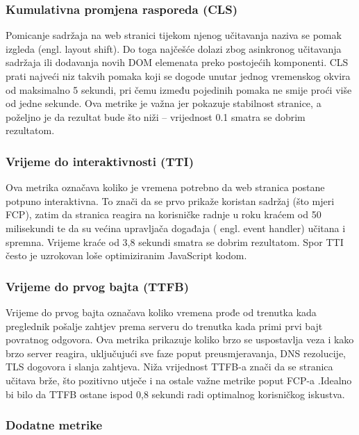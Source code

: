 \subsubsection{Kumulativna promjena rasporeda (CLS)}

Pomicanje sadržaja na web stranici tijekom njenog učitavanja naziva se  pomak izgleda (engl. layout shift). Do toga najčešće dolazi zbog asinkronog učitavanja sadržaja ili dodavanja novih DOM elemenata preko postojećih komponenti. CLS prati najveći niz takvih pomaka koji se dogode unutar jednog vremenskog okvira od maksimalno 5 sekundi, pri čemu između pojedinih pomaka ne smije proći više od jedne sekunde. Ova metrike je važna jer pokazuje stabilnost stranice, a poželjno je da rezultat bude što niži – vrijednost 0.1 smatra se dobrim rezultatom. \cite{nordstrom2023comparison}

\subsubsection{Vrijeme do interaktivnosti (TTI)}

Ova metrika označava koliko je vremena potrebno da web stranica postane potpuno interaktivna. To znači da se prvo prikaže koristan sadržaj (što mjeri FCP), zatim da stranica reagira na korisničke radnje u roku kraćem od 50 milisekundi te da su većina upravljača događaja ( engl. event handler) učitana i spremna. Vrijeme kraće od 3,8 sekundi smatra se dobrim rezultatom. Spor TTI često je uzrokovan loše optimiziranim JavaScript kodom. \cite{nordstrom2023comparison}

\subsubsection{Vrijeme do prvog bajta (TTFB)}

Vrijeme do prvog bajta označava koliko vremena prođe od trenutka kada preglednik pošalje zahtjev prema serveru do trenutka kada primi prvi bajt povratnog odgovora. Ova metrika prikazuje koliko brzo se uspostavlja veza i kako brzo server reagira, uključujući sve faze poput preusmjeravanja, DNS rezolucije, TLS dogovora i slanja zahtjeva. Niža vrijednost TTFB-a znači da se stranica učitava brže, što pozitivno utječe i na ostale važne metrike poput FCP-a .Idealno bi bilo da TTFB ostane ispod 0,8 sekundi radi optimalnog korisničkog iskustva. \cite{pollardttfb}

\subsubsection{Dodatne metrike}

